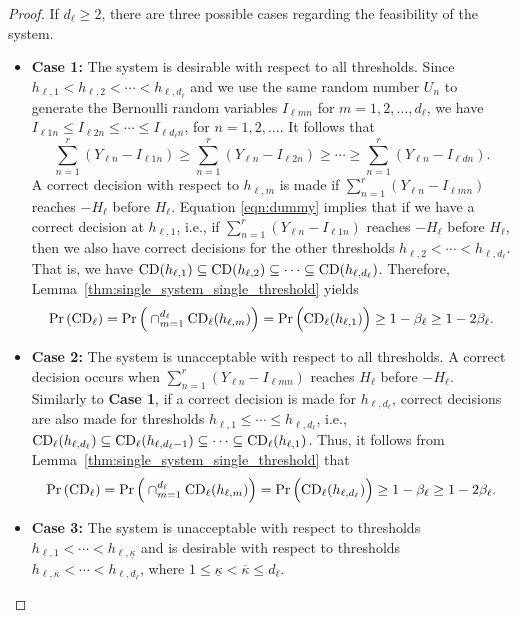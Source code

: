 \documentclass[11pt]{article}
\begin{document}
\begin{proof}
If $d_\ell \ge 2$, there are three possible cases regarding the feasibility of the system. 
\begin{itemize}
    \item[] {\bf Case 1:}  The system is desirable with respect to all thresholds. Since $h_{\ell,1} < h_{\ell,2} < \cdots < h_{\ell,d_\ell}$ and we use the same random number $U_{n}$ to generate the Bernoulli random variables $I_{\ell mn}$ for $m=1,2,\ldots,d_\ell$, we have $I_{\ell 1n} \le I_{\ell 2n} \le \cdots \le I_{\ell d_\ell n}$, for $n=1,2,\ldots$. It follows that
    \begin{equation} \label{eqn:dummy}
    \sum_{n=1}^{r}\left(Y_{\ell n} -I_{\ell 1n}\right) \ge \sum_{n=1}^{r}\left(Y_{\ell n} -I_{\ell 2n}\right)\ge \cdots \ge \sum_{n=1}^{r}\left(Y_{\ell n} -I_{\ell d n}\right).
    \end{equation}
    A correct decision with respect to $h_{\ell, m}$ is made if $\sum_{n=1}^{r}(Y_{\ell n} -I_{\ell mn})$ reaches $-H_\ell$ before $H_\ell$. Equation \eqref{eqn:dummy} implies that if we have a correct decision at $h_{\ell, 1}$, i.e.,  if $\sum_{n=1}^{r}(Y_{\ell n} -I_{\ell 1n})$ reaches $-H_\ell$ before $H_\ell$, then we also have correct decisions for the other thresholds $h_{\ell, 2}< \cdots < h_{\ell, d_\ell}$. That is, we have ${\rm CD}(h_{\ell,1}) \subseteq {\rm CD}(h_{\ell, 2}) \subseteq \cdots \subseteq {\rm CD}(h_{\ell, d_\ell})$. Therefore, Lemma~\ref{thm:single_system_single_threshold} yields
    \[ 
    \Pr\left( {\rm CD}_\ell \right)=\Pr\Big(\cap_{m=1}^{d_\ell} {\rm CD}_\ell(h_{\ell, m})\Big) = \Pr\Big( {\rm CD}_\ell(h_{\ell,1})\Big) \ge 1 - \beta_\ell \ge 1 - 2 \beta_\ell.
    \] 
    \item[] {\bf Case 2:} The system is unacceptable with respect to all thresholds. A correct decision occurs when $\sum_{n=1}^{r}(Y_{\ell n} -I_{\ell mn})$ reaches $H_\ell$ before $-H_\ell$. Similarly to {\bf Case 1}, if a correct decision is made for $h_{\ell, d_\ell}$, correct decisions are also made for thresholds $h_{\ell, 1}\leq \cdots\leq h_{\ell, d_\ell}$, i.e., ${\rm CD}_\ell(h_{\ell, d_\ell}) \subseteq {\rm CD}_\ell(h_{\ell,d_\ell-1}) \subseteq \cdots \subseteq {\rm CD}_\ell(h_{\ell,1})$. Thus, it follows from Lemma~\ref{thm:single_system_single_threshold} that
    \[ 
    \Pr\left( {\rm CD}_\ell \right)=\Pr\Big(\cap_{m=1}^{d_\ell} {\rm CD}_\ell(h_{\ell,m})\Big) = \Pr\Big( {\rm CD}_\ell(h_{\ell,d_\ell})\Big) \ge 1 - \beta_\ell \ge 1 - 2\beta_\ell.
    \]
    \item[] {\bf Case 3:} The system is unacceptable with respect to thresholds $h_{\ell, 1} < \cdots < h_{\ell, \underline{\kappa}}$ and is desirable with respect to thresholds $h_{\ell, \overline{\kappa}} < \cdots < h_{\ell,d_\ell}$, where $1\leq \underline{\kappa} <  \overline{\kappa}\leq d_\ell$.

\end{itemize}
\end{proof}
\end{document}
